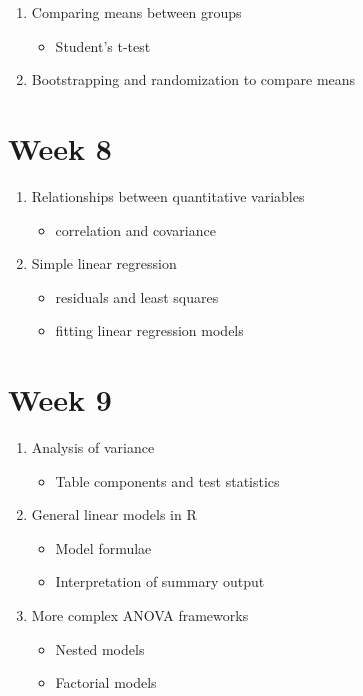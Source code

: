 \documentclass[]{book}
\providecommand{\tightlist}{%
  \setlength{\itemsep}{0pt}\setlength{\parskip}{0pt}}
\begin{document}
\begin{enumerate}
\def\labelenumi{\arabic{enumi}.}
\tightlist
\item
  Comparing means between groups

  \begin{itemize}
  \tightlist
  \item
    Student's t-test
  \end{itemize}
\item
  Bootstrapping and randomization to compare means
\end{enumerate}

\hypertarget{week-8}{%
\section{Week 8}\label{week-8}}

\begin{enumerate}
\def\labelenumi{\arabic{enumi}.}
\tightlist
\item
  Relationships between quantitative variables

  \begin{itemize}
  \tightlist
  \item
    correlation and covariance
  \end{itemize}
\item
  Simple linear regression

  \begin{itemize}
  \tightlist
  \item
    residuals and least squares
  \item
    fitting linear regression models
  \end{itemize}
\end{enumerate}

\hypertarget{week-9}{%
\section{Week 9}\label{week-9}}

\begin{enumerate}
\def\labelenumi{\arabic{enumi}.}
\tightlist
\item
  Analysis of variance

  \begin{itemize}
  \tightlist
  \item
    Table components and test statistics
  \end{itemize}
\item
  General linear models in R

  \begin{itemize}
  \tightlist
  \item
    Model formulae
  \item
    Interpretation of summary output
  \end{itemize}
\item
  More complex ANOVA frameworks

  \begin{itemize}
  \tightlist
  \item
    Nested models
  \item
    Factorial models
  \end{itemize}
\end{enumerate}
\end{document}
